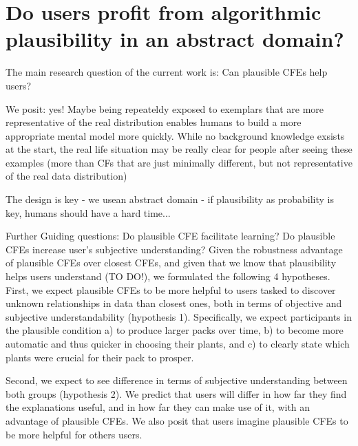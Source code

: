 \section{Do users profit from algorithmic plausibility in an abstract domain?}\label{sec:hypotheses}


\textcolor{ACMDarkBlue}{
The main research question of the current work is: Can plausible \glspl{CFE} help users?
}

\textcolor{ACMDarkBlue}{
We posit: yes! Maybe being repeateldy exposed to exemplars that are more representative of the real distribution enables humans to build a more appropriate mental model more quickly. While no background knowledge exsists at the start, the real life situation may be really clear for people after seeing these examples (more than CFs that are just minimally different, but not representative of the real data distribution)
}

\textcolor{ACMDarkBlue}{
The design is key - we usean abstract domain - if plausibility as probability is key, humans should have a hard time...
}

\textcolor{ACMDarkBlue}{
Further Guiding questions:
Do plausible \gls{CFE} facilitate learning?
Do plausible \glspl{CFE} increase user's subjective understanding?
Given the robustness advantage of plausible \glspl{CFE} over closest \glspl{CFE}, and given that we know that plausibility helps users understand (TO DO!), we formulated the following 4 hypotheses.
}
First, we expect plausible \glspl{CFE} to be more helpful to users tasked to discover unknown relationships in data than closest ones, both in terms of objective and subjective understandability (hypothesis 1). 
Specifically, we expect participants in the plausible condition a) to produce larger packs over time, b) to become more automatic and thus quicker in choosing their plants, and c) to clearly state which plants were crucial for their pack to prosper. %

Second, we expect to see difference in terms of subjective understanding between both groups (hypothesis 2).
We predict that users will differ in how far they find the explanations useful, and in how far they can make use of it, with an advantage of plausible CFEs. %
We also posit that users imagine plausible CFEs to be more helpful for others users. %

